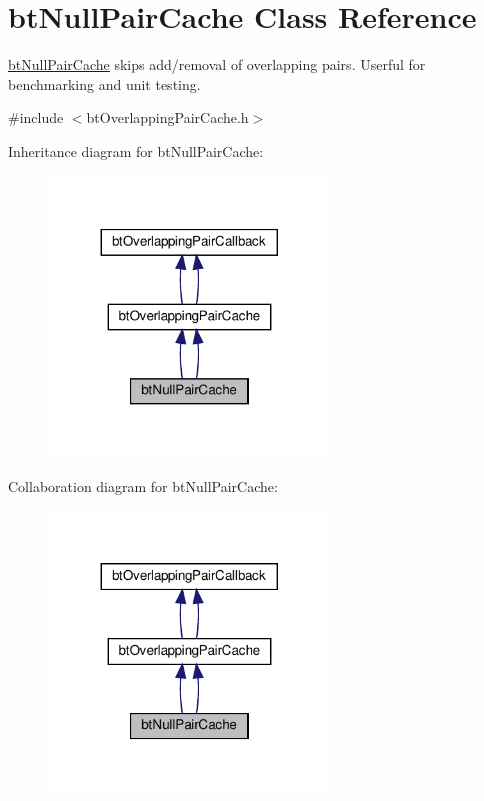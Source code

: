 \hypertarget{classbtNullPairCache}{}\section{bt\+Null\+Pair\+Cache Class Reference}
\label{classbtNullPairCache}


\hyperlink{classbtNullPairCache}{bt\+Null\+Pair\+Cache} skips add/removal of overlapping pairs. Userful for benchmarking and unit testing.  




{\ttfamily \#include $<$bt\+Overlapping\+Pair\+Cache.\+h$>$}



Inheritance diagram for bt\+Null\+Pair\+Cache\+:
\nopagebreak
\begin{figure}[H]
\begin{center}
\leavevmode
\includegraphics[width=212pt]{classbtNullPairCache__inherit__graph}
\end{center}
\end{figure}


Collaboration diagram for bt\+Null\+Pair\+Cache\+:
\nopagebreak
\begin{figure}[H]
\begin{center}
\leavevmode
\includegraphics[width=212pt]{classbtNullPairCache__coll__graph}
\end{center}
\end{figure}
